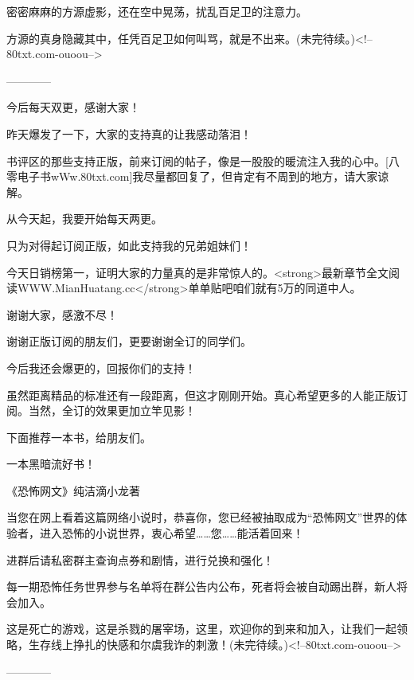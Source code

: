 \begin{this_body}
密密麻麻的方源虚影，还在空中晃荡，扰乱百足卫的注意力。

方源的真身隐藏其中，任凭百足卫如何叫骂，就是不出来。(未完待续。)<!--80txt.com-ouoou-->

------------

今后每天双更，感谢大家！

昨天爆发了一下，大家的支持真的让我感动落泪！

书评区的那些支持正版，前来订阅的帖子，像是一股股的暖流注入我的心中。[八零电子书wWw.80txt.com]我尽量都回复了，但肯定有不周到的地方，请大家谅解。

从今天起，我要开始每天两更。

只为对得起订阅正版，如此支持我的兄弟姐妹们！

今天日销榜第一，证明大家的力量真的是非常惊人的。<strong>最新章节全文阅读WWW.MianHuatang.cc</strong>单单贴吧咱们就有5万的同道中人。

谢谢大家，感激不尽！

谢谢正版订阅的朋友们，更要谢谢全订的同学们。

今后我还会爆更的，回报你们的支持！

虽然距离精品的标准还有一段距离，但这才刚刚开始。真心希望更多的人能正版订阅。当然，全订的效果更加立竿见影！

下面推荐一本书，给朋友们。

一本黑暗流好书！

《恐怖网文》纯洁滴小龙著

当您在网上看着这篇网络小说时，恭喜你，您已经被抽取成为“恐怖网文”世界的体验者，进入恐怖的小说世界，衷心希望……您……能活着回来！

进群后请私密群主查询点券和剧情，进行兑换和强化！

每一期恐怖任务世界参与名单将在群公告内公布，死者将会被自动踢出群，新人将会加入。

这是死亡的游戏，这是杀戮的屠宰场，这里，欢迎你的到来和加入，让我们一起领略，生存线上挣扎的快感和尔虞我诈的刺激！(未完待续。)<!--80txt.com-ouoou-->

------------

\end{this_body}

